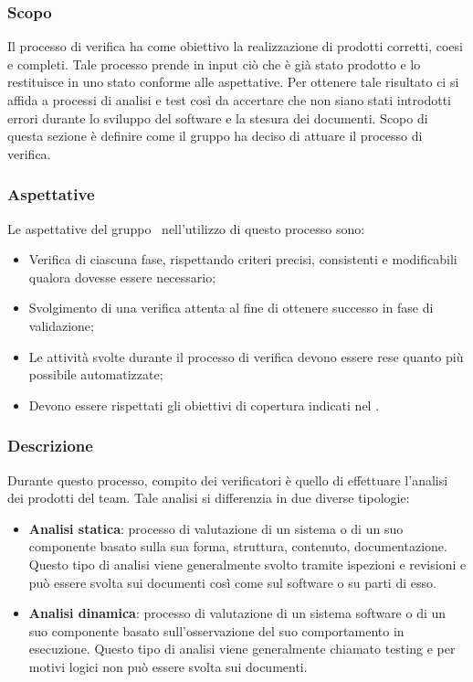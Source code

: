     \subsubsection{Scopo}
    Il processo di verifica ha come obiettivo la realizzazione di prodotti corretti, coesi e completi. Tale processo prende in input ciò che è già stato prodotto e lo restituisce in uno stato conforme alle aspettative. Per ottenere tale risultato ci si affida a processi di analisi e test così da accertare che non siano stati introdotti errori durante lo sviluppo del software e la stesura dei documenti. Scopo di questa sezione è definire come il gruppo ha deciso di attuare il processo di verifica.

    \subsubsection{Aspettative}
    Le aspettative del gruppo \groupName\ nell’utilizzo di questo processo sono:
    \begin{itemize}
        \item Verifica di ciascuna fase, rispettando criteri precisi, consistenti e modificabili qualora dovesse essere necessario;
        \item Svolgimento di una verifica attenta al fine di ottenere successo in fase di validazione;
        \item Le attività svolte durante il processo di verifica devono essere rese quanto più possibile automatizzate;
        \item Devono essere rispettati gli obiettivi di copertura indicati nel \docNamePdQLow.
    \end{itemize}

    \subsubsection{Descrizione}
    Durante questo processo, compito dei verificatori è quello di effettuare l'analisi dei prodotti del team. Tale analisi si differenzia in due diverse tipologie:
    \begin{itemize}
        \item \textbf{Analisi statica}: processo di valutazione di un sistema o di un suo componente basato sulla sua forma, struttura, contenuto, documentazione. Questo tipo di analisi viene generalmente svolto tramite ispezioni e revisioni e può essere svolta sui documenti così come sul software o su parti di esso.
        \item \textbf{Analisi dinamica}: processo di valutazione di un sistema software o di un suo componente basato sull'osservazione del suo comportamento in esecuzione. Questo tipo di analisi viene generalmente chiamato testing e per motivi logici non può essere svolta sui documenti.
    \end{itemize}

